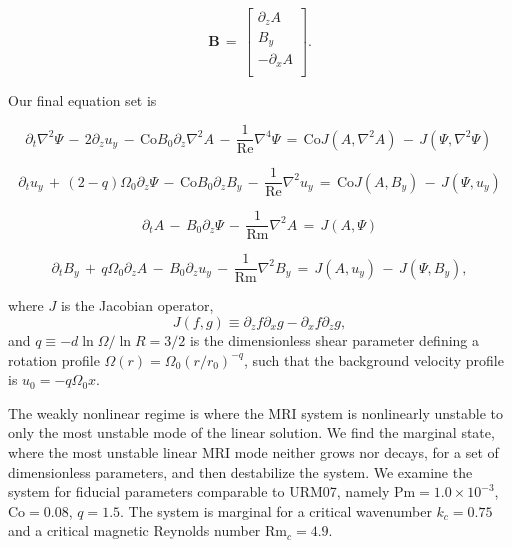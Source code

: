 \documentclass[twocolumn]{aastex61}
\newcommand{\beq}{\begin{equation}}
\newcommand{\eeq}{\end{equation}}
\newcommand\reye{\mathrm{Re}}
\newcommand\reym{\mathrm{Rm}}
\newcommand{\Pm}{\mathrm{Pm}}
\newcommand{\Co}{\mathrm{Co}}
\begin{document}
\beq
\mathbf{B} \, = \, \left[\begin{matrix}
\partial_zA \\
B_{y} \\
-\partial_xA \\
\end{matrix}\right].\eeq

\onecolumngrid
Our final equation set is


\beq
\label{eqset1}
\partial_t \nabla^2 \Psi \, - \, 2 \partial_z u_{y} \, - \, \Co B_0 \partial_z \nabla^2 A \, - \, \frac{1}{\reye}\nabla^4 \Psi \, = \, \Co J\left(A, \nabla^2 A \right) \, - \, J\left(\Psi, \nabla^2 \Psi\right) \, 
\eeq

\beq
\label{eqset2}
\partial_t u_{y} \, + \, \left(2 - q\right) \Omega_0 \partial_z \Psi \, - \, \Co B_0\partial_z B_{y} \, - \, \frac{1}{\reye} \nabla^2 u_{y} \, = \, \Co J\left(A, B_{y}\right) \, - \, J\left(\Psi, u_{y}\right) 
\eeq

\beq
\label{eqset3}
\partial_t A \, - \, B_0 \partial_z \Psi \, - \, \frac{1}{\reym} \nabla^2 A \, = \, J\left(A, \Psi\right) 
\eeq

\beq
\label{eqset4}
\partial_t B_{y} \, + \, q \Omega_0 \partial_z A \, - \, B_0 \partial_z u_{y} \, - \, \frac{1}{\reym} \nabla^2 B_{y} \, = \, J\left(A, u_{y}\right) \, - \, J\left(\Psi, B_{y}\right)  ,
\eeq
\twocolumngrid

where $J$ is the Jacobian operator, 
\beq
J\left(f, g\right) \equiv \partial_z f\partial_x g - \partial_x f \partial_z g,
\eeq  
and $q \equiv - d \ln \Omega/ \ln R = 3/2$ is the dimensionless shear parameter defining a rotation profile $\Omega(r) = \Omega_0 (r/r_0)^{-q}$, such that the background velocity profile is $u_0 = -q \Omega_0 x$.

The weakly nonlinear regime is where the MRI system is nonlinearly unstable to only the most unstable mode of the linear solution. We find the marginal state, where the most unstable linear MRI mode neither grows nor decays, for a set of dimensionless parameters, and then destabilize the system. We examine the system for fiducial parameters comparable to URM07, namely $\Pm = 1.0 \times 10^{-3}$, $\Co = 0.08$, $q = 1.5$. The system is marginal for a critical wavenumber $k_c = 0.75$ and a critical magnetic Reynolds number $\reym_c = 4.9$.
\end{document}
